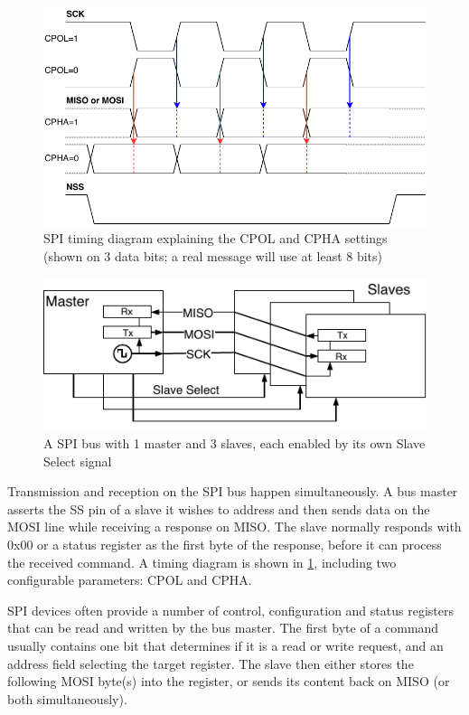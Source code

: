 \begin{figure}[h]
	\centering
	\includegraphics[scale=.9] {img/spi-timing.pdf}
	\caption[SPI timing diagram]{\label{fig:spi_timing}SPI timing diagram explaining the CPOL and CPHA settings (shown on 3 data bits; a real message will use at least 8 bits)}
\end{figure}

\begin{figure}[h]
\centering
\includegraphics[scale=1.1] {img/spi-multislave-redraw.pdf}
\caption[SPI master with multiple slaves]{\label{fig:spi_multislave}A SPI bus with 1 master and 3 slaves, each enabled by its own Slave Select signal}
\end{figure}

Transmission and reception on the \gls{SPI} bus happen simultaneously. A bus master asserts the \gls{SS} pin of a slave it wishes to address and then sends data on the \gls{MOSI} line while receiving a response on \gls{MISO}. The slave normally responds with 0x00 or a status register as the first byte of the response, before it can process the received command. A timing diagram is shown in \cref{fig:spi_timing}, including two configurable parameters: \gls{CPOL} and \gls{CPHA}.

\gls{SPI} devices often provide a number of control, configuration and status registers that can be read and written by the bus master. The first byte of a command usually contains one bit that determines if it is a read or write request, and an address field selecting the target register. The slave then either stores the following \gls{MOSI} byte(s) into the register, or sends its content back on \gls{MISO} (or both simultaneously).

